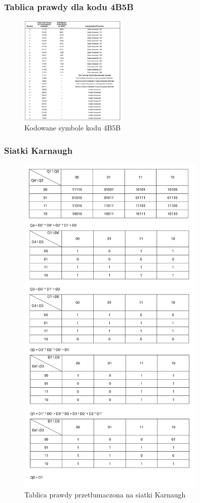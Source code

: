 \documentclass{article}
\begin{document}
\subsubsection{Tablica prawdy dla kodu 4B5B}
\begin{figure}[H]  
    \centering
    \includegraphics[width=0.45\textwidth]{tablica.png}
    \caption{Kodowane symbole kodu 4B5B}
    \label{fig:mojobrazek1}
\end{figure}

\subsubsection{Siatki Karnaugh}
\begin{figure}[H]  
    \centering
    \includegraphics[width=0.8\textwidth]{siatki.png}
    \caption{Tablica prawdy przetłumaczona na siatki Karnaugh}
    \label{fig:mojobrazek2}
\end{figure}
\end{document}
